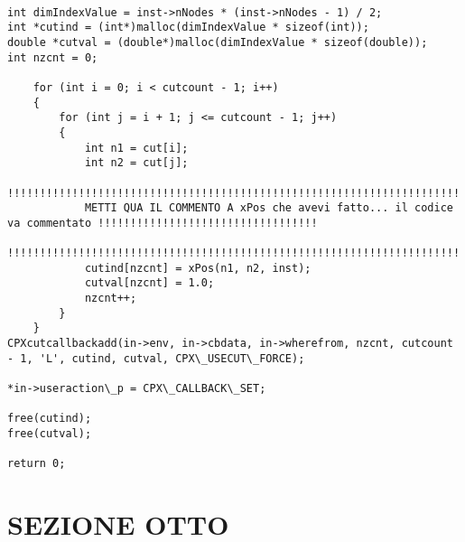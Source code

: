 \documentclass[11pt]{article}
\begin{document}
\begin{lstlisting}

int dimIndexValue = inst->nNodes * (inst->nNodes - 1) / 2;
int *cutind = (int*)malloc(dimIndexValue * sizeof(int));
double *cutval = (double*)malloc(dimIndexValue * sizeof(double));
int nzcnt = 0;

    for (int i = 0; i < cutcount - 1; i++)
    {
        for (int j = i + 1; j <= cutcount - 1; j++)
        {
            int n1 = cut[i];
            int n2 = cut[j];
            !!!!!!!!!!!!!!!!!!!!!!!!!!!!!!!!!!!!!!!!!!!!!!!!!!!!!!!!!!!!!!!!!!!!!!!!!!!!!!!!!!!!!!!!!!!!!!!!!!!!!!!!!!
            METTI QUA IL COMMENTO A xPos che avevi fatto... il codice va commentato !!!!!!!!!!!!!!!!!!!!!!!!!!!!!!!!!!
            !!!!!!!!!!!!!!!!!!!!!!!!!!!!!!!!!!!!!!!!!!!!!!!!!!!!!!!!!!!!!!!!!!!!!!!!!!!!!!!!!!!!!!!!!!!!!!!!!!!!!!!!!!
            cutind[nzcnt] = xPos(n1, n2, inst);
            cutval[nzcnt] = 1.0;
            nzcnt++;
        }
    }
CPXcutcallbackadd(in->env, in->cbdata, in->wherefrom, nzcnt, cutcount - 1, 'L', cutind, cutval, CPX\_USECUT\_FORCE);

*in->useraction\_p = CPX\_CALLBACK\_SET;

free(cutind);
free(cutval);

return 0;

\end{lstlisting}

\section*{SEZIONE OTTO}
\label{sec:SezioneOttoS}
\end{document}
